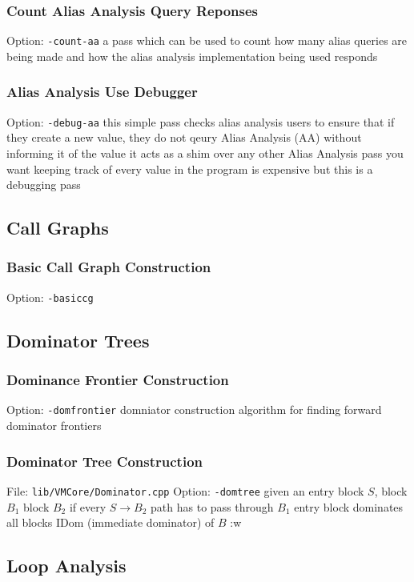\documentclass{myproc}
\begin{document}
\subsubsection{Count Alias Analysis Query Reponses}
\bit
\w Option: \verb+-count-aa+
\w a pass which can be used to count how many alias queries are being made and
how the alias analysis implementation being used responds
\eit

\subsubsection{Alias Analysis Use Debugger}
\bit
\w Option: \verb+-debug-aa+
\w this simple pass checks alias analysis users to ensure that if they create
a new value, they do not qeury Alias Analysis (AA) without informing it of the
value
\w it acts as a shim over any other Alias Analysis pass you want
\w keeping track of every value in the program is expensive but this is a
debugging pass
\eit

\subsection{Call Graphs}
\subsubsection{Basic Call Graph Construction}
\bit
\w Option: \verb+-basiccg+
\w 
\eit

\subsection{Dominator Trees}
\subsubsection{Dominance Frontier Construction}
\bit
\w Option: \verb+-domfrontier+
\w domniator construction algorithm for finding forward dominator frontiers
\eit
\subsubsection{Dominator Tree Construction}
\bit
\w File: \verb+lib/VMCore/Dominator.cpp+
\w Option: \verb+-domtree+
\w given an entry block $S$, block $B_1$  block $B_2$ if every
$S \rightarrow B_2$ path has to pass through $B_1$
 \bit
 \w entry block dominates all blocks
 \w IDom (immediate dominator) of $B$ :w
 \eit
\eit

\subsection{Loop Analysis}
\end{document}
